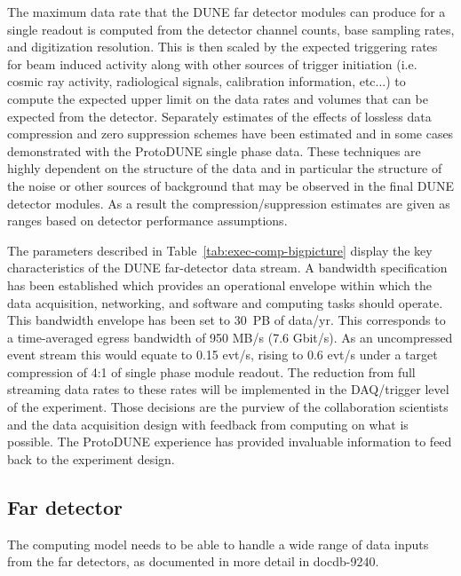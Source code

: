 The maximum data rate that the DUNE far detector modules can produce for a single readout is computed from the detector channel counts, base sampling rates, and digitization resolution.  This is then scaled by the expected triggering rates for beam induced activity along with other sources of trigger initiation (i.e. cosmic ray activity, radiological signals, calibration information, etc...) to compute the expected upper limit on the data rates and volumes that can be expected from the detector.  Separately estimates of the effects of lossless data compression and zero suppression schemes have been estimated and in some cases demonstrated with the ProtoDUNE single phase data.  These techniques are highly dependent  on the structure of the data and in particular the structure of the noise or other sources of background that may be observed in the final DUNE detector modules.  As a result the compression/suppression estimates are given as ranges based on detector performance assumptions.

The parameters described in Table~\ref{tab:exec-comp-bigpicture} display the key characteristics of the DUNE far-detector data stream.  A bandwidth specification has been established which provides an operational envelope within which the data acquisition, networking, and software and computing tasks should  operate. This bandwidth envelope has been set to  30~PB of data/yr.  This corresponds to a time-averaged egress bandwidth  of 950 MB/s (7.6 Gbit/s).  As an uncompressed event stream this would equate to 0.15 evt/s, rising to 0.6 evt/s under a target compression of 4:1 of single phase module readout.    The reduction from full streaming data rates to these rates will be implemented in the DAQ/trigger level of the experiment. 
Those decisions are the purview of the collaboration scientists and the data acquisition design with feedback from computing on what is possible.  The ProtoDUNE experience has provided invaluable information to feed back to the experiment design. 

\subsection{Far detector}

The computing model needs to be able to handle a wide range of data inputs from the far detectors, as documented in more detail in docdb-9240.

